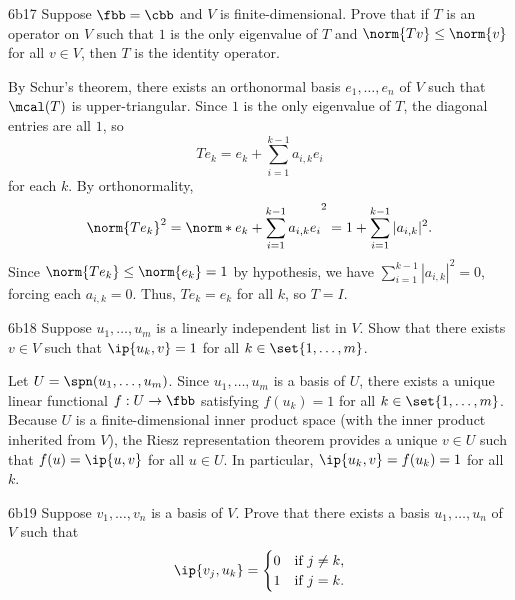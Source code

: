 \begin{exercise}{6b17}
    Suppose $\fbb = \cbb$ and $V$ is finite-dimensional.
    Prove that if $T$ is an operator on $V$ such that $1$ is the only eigenvalue of $T$ and $\norm{Tv} \leq \norm{v}$ for all $v \in V$, then $T$ is the identity operator.
\end{exercise}

\begin{sol}
    By Schur's theorem, there exists an orthonormal basis $e_1, \ldots, e_n$ of $V$ such that $\mcal(T)$ is upper-triangular.
    Since $1$ is the only eigenvalue of $T$, the diagonal entries are all $1$, so
    \[
        Te_k = e_k + \sum_{i=1}^{k-1} a_{i,k} e_i
    \]
    for each $k$.
    By orthonormality,
    \[
        \norm{Te_k}^2 = \norm*{e_k + \sum_{i=1}^{k-1} a_{i,k} e_i}^2 = 1 + \sum_{i=1}^{k-1} |a_{i,k}|^2.
    \]
    Since $\norm{Te_k} \leq \norm{e_k} = 1$ by hypothesis, we have $\sum_{i=1}^{k-1} |a_{i,k}|^2 = 0$, forcing each $a_{i,k} = 0$.
    Thus, $Te_k = e_k$ for all $k$, so $T = I$.
\end{sol}

\begin{exercise}{6b18}
    Suppose $u_1, \ldots, u_m$ is a linearly independent list in $V$.
    Show that there exists $v \in V$ such that $\ip{u_k, v} = 1$ for all $k \in \set{1, \ldots, m}$.
\end{exercise}

\begin{sol}
    Let $U = \spn(u_1, \ldots, u_m)$.
    Since $u_1, \ldots, u_m$ is a basis of $U$, there exists a unique linear functional $f : U \to \fbb$ satisfying $f(u_k) = 1$ for all $k \in \set{1, \ldots, m}$.
    Because $U$ is a finite-dimensional inner product space (with the inner product inherited from $V$), the Riesz representation theorem provides a unique $v \in U$ such that $f(u) = \ip{u, v}$ for all $u \in U$.
    In particular, $\ip{u_k, v} = f(u_k) = 1$ for all $k$.
\end{sol}

\begin{exercise}{6b19}
    Suppose $v_1, \ldots, v_n$ is a basis of $V$.
    Prove that there exists a basis $u_1, \ldots, u_n$ of $V$ such that
    \[
        \ip{v_j, u_k} = 
        \begin{cases}
            0 & \text{if } j \neq k, \\
            1 & \text{if } j = k.
        \end{cases}
    \]
\end{exercise}

